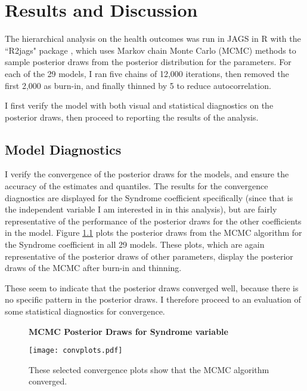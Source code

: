 \chapter{Results and Discussion}

The hierarchical analysis on the health outcomes was run in JAGS in R with the ``R2jags" package \citep{r2jags}, which uses Markov chain Monte Carlo (MCMC) methods to sample posterior draws from the posterior distribution for the parameters. For each of the 29 models, I ran five chains of 12,000 iterations, then removed the first 2,000 as burn-in, and finally thinned by 5 to reduce autocorrelation. 

I first verify the model with both visual and statistical diagnostics on the posterior draws, then proceed to reporting the results of the analysis.

\section{Model Diagnostics}

I verify the convergence of the posterior draws for the models, and ensure the accuracy of the estimates and quantiles. The results for the convergence diagnostics are displayed for the Syndrome coefficient specifically (since that is the independent variable I am interested in in this analysis), but are fairly representative of the performance of the posterior draws for the other coefficients in the model. Figure \ref{convplots} plots the posterior draws from the MCMC algorithm for the Syndrome coefficient in all 29 models. These plots, which are again representative of the posterior draws of other parameters, display the posterior draws of the MCMC after burn-in and thinning. 

These seem to indicate that the posterior draws converged well, because there is no specific pattern in the posterior draws. I therefore proceed to an evaluation of some statistical diagnostics for convergence. 

\begin{figure}[H]
\renewcommand\thefigure{3.1}
\centering
\textbf{MCMC Posterior Draws for Syndrome variable}\par\medskip
\centering
  \texttt{[image: convplots.pdf]}
  \caption{These selected convergence plots show that the MCMC algorithm converged.}
  \label{convplots}
\end{figure}

